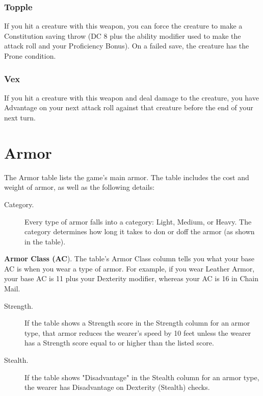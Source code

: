 \documentclass[10pt,a4paper,twoside,bg=print,twocolumn,openany,nodeprecatedcode]{dndbook}
\begin{document}
\subsubsection{Topple}
If you hit a creature with this weapon, you can force the creature to make a Constitution saving throw (DC 8 plus the ability modifier used to make the attack roll and your Proficiency Bonus). On a failed save, the creature has the Prone condition.

\subsubsection{Vex}
If you hit a creature with this weapon and deal damage to the creature, you have Advantage on your next attack roll against that creature before the end of your next turn.

\section{Armor}
The Armor table lists the game's main armor. The table includes the cost and weight of armor, as well as the following details:


\begin{description}
\item[Category.]
Every type of armor falls into a category: Light, Medium, or Heavy. The category determines how long it takes to don or doff the armor (as shown in the table).
\end{description}

\textbf{Armor Class (AC}). The table's Armor Class column tells you what your base AC is when you wear a type of armor. For example, if you wear Leather Armor, your base AC is 11 plus your Dexterity modifier, whereas your AC is 16 in Chain Mail.


\begin{description}
\item[Strength.]
If the table shows a Strength score in the Strength column for an armor type, that armor reduces the wearer's speed by 10 feet unless the wearer has a Strength score equal to or higher than the listed score.
\item[Stealth.]
If the table shows "Disadvantage" in the Stealth column for an armor type, the wearer has Disadvantage on Dexterity (Stealth) checks.
\end{description}
\end{document}
